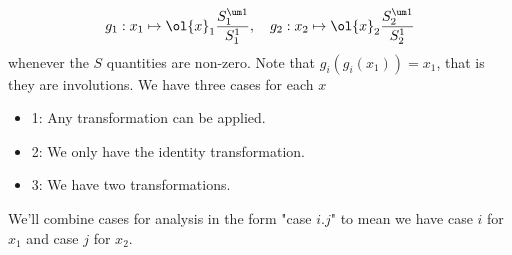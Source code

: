 \begin{align}
	g_1 : x_1 \mapsto \ol{x}_1\frac{S_1^{\um 1}}{S_1^{1}},\quad g_2 : x_2 \mapsto \ol{x}_2\frac{S_2^{\um 1}}{S_2^{1}}
\end{align}
whenever the $S$ quantities are non-zero. Note that $g_i(g_i(x_1)) = x_1$, that is they are involutions. We have three cases for each $x$
\begin{itemize}
\item 1: Any transformation can be applied.
\item 2: We only have the identity transformation.
\item 3: We have two transformations.
 \end{itemize}
 We'll combine cases for analysis in the form "case $i.j$" to mean we have case $i$ for $x_1$ and case $j$ for $x_2$.

